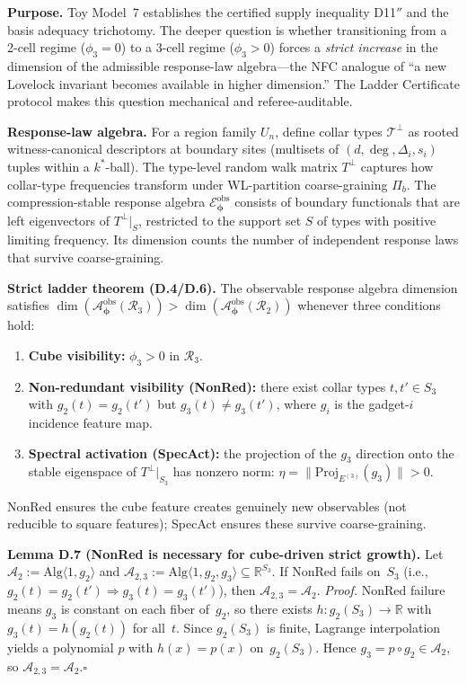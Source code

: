 \documentclass[11pt,a4paper]{article}
\theoremstyle{definition}
\theoremstyle{remark}
\begin{document}
\textbf{Purpose.} Toy Model~7 establishes the certified supply inequality D11$''$ and the basis adequacy trichotomy. The deeper question is whether transitioning from a 2-cell regime ($\phi_3 = 0$) to a 3-cell regime ($\phi_3 > 0$) forces a \emph{strict increase} in the dimension of the admissible response-law algebra---the NFC analogue of ``a new Lovelock invariant becomes available in higher dimension.'' The Ladder Certificate protocol makes this question mechanical and referee-auditable.

\textbf{Response-law algebra.} For a region family $U_n$, define collar types $\mathcal{T}^\perp$ as rooted witness-canonical descriptors at boundary sites (multisets of $(d, \deg, \Delta_i, s_i)$ tuples within a $k^*$-ball). The type-level random walk matrix $T^\perp$ captures how collar-type frequencies transform under WL-partition coarse-graining $\Pi_b$. The compression-stable response algebra $\mathscr{E}^{\text{obs}}_{\boldsymbol\phi}$ consists of boundary functionals that are left eigenvectors of $T^\perp|_S$, restricted to the support set $S$ of types with positive limiting frequency. Its dimension counts the number of independent response laws that survive coarse-graining.

\textbf{Strict ladder theorem (D.4/D.6).} The observable response algebra dimension satisfies $\dim(\mathscr{A}^{\text{obs}}_{\boldsymbol\phi}(\mathcal{R}_3)) > \dim(\mathscr{A}^{\text{obs}}_{\boldsymbol\phi}(\mathcal{R}_2))$ whenever three conditions hold:
\begin{enumerate}[nosep]
  \item \textbf{Cube visibility:} $\phi_3 > 0$ in $\mathcal{R}_3$.
  \item \textbf{Non-redundant visibility (NonRed):} there exist collar types $t, t' \in S_3$ with $g_2(t) = g_2(t')$ but $g_3(t) \neq g_3(t')$, where $g_i$ is the gadget-$i$ incidence feature map.
  \item \textbf{Spectral activation (SpecAct):} the projection of the $g_3$ direction onto the stable eigenspace of $T^\perp|_{S_3}$ has nonzero norm: $\eta = \|\mathrm{Proj}_{E^{(3)}}(g_3)\| > 0$.
\end{enumerate}
NonRed ensures the cube feature creates genuinely new observables (not reducible to square features); SpecAct ensures these survive coarse-graining.

\textbf{Lemma D.7 (NonRed is necessary for cube-driven strict growth).}
Let $\mathscr{A}_2 := \mathrm{Alg}\langle 1, g_2\rangle$ and $\mathscr{A}_{2,3} := \mathrm{Alg}\langle 1, g_2, g_3\rangle \subseteq \mathbb{R}^{S_3}$.
If NonRed fails on~$S_3$ (i.e., $g_2(t)=g_2(t') \Rightarrow g_3(t)=g_3(t')$), then $\mathscr{A}_{2,3} = \mathscr{A}_2$.
\emph{Proof.}
NonRed failure means $g_3$ is constant on each fiber of~$g_2$, so there exists $h\colon g_2(S_3)\to\mathbb{R}$ with $g_3(t)=h(g_2(t))$ for all~$t$.
Since $g_2(S_3)$ is finite, Lagrange interpolation yields a polynomial $p$ with $h(x)=p(x)$ on~$g_2(S_3)$.
Hence $g_3 = p \circ g_2 \in \mathscr{A}_2$, so $\mathscr{A}_{2,3} = \mathscr{A}_2$.\quad$\square$
\end{document}
